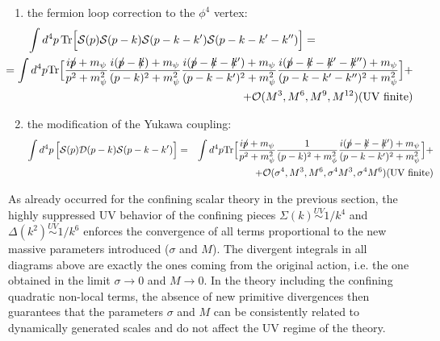 \begin{enumerate}[label=(\alph*)]
\item the fermion loop correction to the $\phi^4$ vertex:
\begin{eqnarray}
 \int d^4 p\,{\rm Tr}\Big[{\cal S}(p){\cal S}(p-k){\cal S}(p-k-k'){\cal S}(p-k-k'-k'')  \Big]
 &=& \nonumber\\&&\hspace{-10cm}=
  \int d^4 p {\rm Tr}\Big[ \frac{i\pslash +m_{\psi}}{p^2 +  m_{\psi}^2}
\frac{i(\pslash-\kslash) +m_{\psi}}{(p-k)^2 +  m_{\psi}^2} \frac{i(\pslash -\kslash -\kslash')+
m_{\psi}}{(p-k-k')^2 +  m_{\psi}^2}
  \frac{i(\pslash -\kslash -\kslash'-\kslash'')+ m_{\psi}}{(p-k-k'-k'')^2 +  m_{\psi}^2}\Big]
+\nonumber \\
 &&
\hspace{-6cm}+ {\cal O}( M^3, M^6, M^{9},M^{12}) (\text{UV finite}) 
\end{eqnarray}

\item the modification of the Yukawa coupling:
\begin{eqnarray}
 \int d^4 p\,\Big[{\cal S}(p){\cal D}(p-k){\cal S}(p-k-k') \Big]
 &=& 
  \int d^4 p {\rm Tr}\Big[ \frac{ip \hspace{-1.7mm} / +m_{\psi}}{p^2 +  m_{\psi}^2}\frac{1}{(p-k)^2 +
m_{\phi}^2} \frac{i(p \hspace{-1.7mm} /-k \hspace{-1.7mm} /-k \hspace{-1.7mm} /') +m_{\psi}}{(p-k-k')^2 +  m_{\psi}^2} 
 \Big] +\nonumber \\
 &&+ {\cal O}( \sigma^4,M^3, M^6, \sigma^4 M^3, \sigma^4 M^6) (\text{UV finite}) 
\end{eqnarray}


\end{enumerate}

As already occurred for the confining scalar theory in the previous section, the highly
suppressed UV behavior of the confining pieces $\Sigma(k)\stackrel{UV}{\sim} 1/k^4$ and
$\Delta(k^2)\stackrel{UV}{\sim} 1/k^6$ enforces the convergence of all terms proportional to
the new massive parameters introduced ($\sigma$ and $M$).
The divergent integrals in all diagrams above are exactly the ones coming from the original
action, i.e. the one obtained in the limit $\sigma \to 0$ and $M \to 0$. 
In the theory including the confining quadratic non-local terms, the absence
of new primitive divergences then guarantees that the parameters $\sigma$ and $M$ can be
consistently related to dynamically generated scales and do not affect the UV regime of the
theory.

